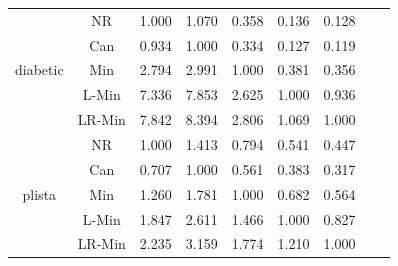 \documentclass[11pt]{book}
\begin{document}
\begin{table}
\begin{tabular}{|c|c|c|c|c|c|c|c|c|}
    \hline
    \multirow{5}{*}{diabetic}
         & NR & 1.000 & 1.070 & 0.358 & 0.136 & 0.128 \\                                                                                                                                                             
         & Can & 0.934 & 1.000 & 0.334 & 0.127 & 0.119 \\                                                                                                                                                            
         & Min & 2.794 & 2.991 & 1.000 & 0.381 & 0.356 \\                                                                                                                                                            
         & L-Min & 7.336 & 7.853 & 2.625 & 1.000 & 0.936 \\                                                                                                                                                          
         & LR-Min & 7.842 & 8.394 & 2.806 & 1.069 & 1.000 \\  
    
    \hline
    \multirow{5}{*}{plista}
         & NR & 1.000 & 1.413 & 0.794 & 0.541 & 0.447 \\                                                                                                                                                             
         & Can & 0.707 & 1.000 & 0.561 & 0.383 & 0.317 \\                                                                                                                                                            
         & Min & 1.260 & 1.781 & 1.000 & 0.682 & 0.564 \\                                                                                                                                                            
         & L-Min & 1.847 & 2.611 & 1.466 & 1.000 & 0.827 \\                                                                                                                                                          
         & LR-Min & 2.235 & 3.159 & 1.774 & 1.210 & 1.000 \\
  

\end{tabular}
\end{table}
\end{document}
